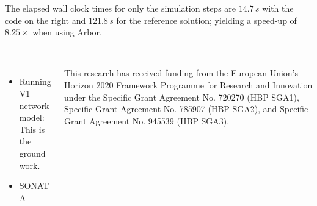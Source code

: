 \documentclass{beamer}
\begin{document}
\begin{frame}[t, fragile]
\begin{columns}[onlytextwidth]
\begin{column}{.49\linewidth}
      The elapsed wall clock times for only the simulation steps are $14.7\,s$
      with the code on the right and $121.8\,s$ for the reference solution;
      yielding a speed-up of $8.25\times$ when using Arbor.
    \end{column}
    \begin{column}{.49\linewidth}
      \inputminted[escapeinside=!!]{python}{src/model.py}
    \end{column}
  \end{columns}
  \vspace*{5ex}
  \begin{columns}[onlytextwidth]
    \begin{column}{.49\linewidth}
      \textbf{}\\
      \begin{itemize}
        \item Running V1 network model: This is the groundwork.
        \item SONATA
      \end{itemize}
    \end{column}
    \begin{column}{.49\linewidth}
      \textbf{}\\
      This research has received funding from the European Union's Horizon 2020
      Framework Programme for Research and Innovation under the Specific Grant
      Agreement No. 720270 (HBP SGA1), Specific Grant Agreement No. 785907 (HBP
      SGA2), and Specific Grant Agreement No. 945539 (HBP SGA3).\\[1.5ex]
      
      \textbf{}\\
    \end{column}
  \end{columns}
\end{frame}
\end{document}

